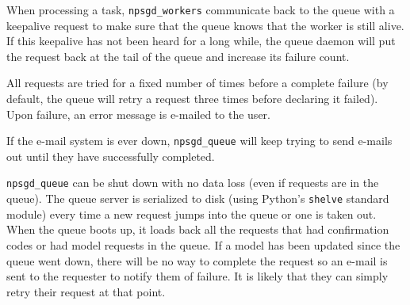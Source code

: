 \documentclass{article}
\begin{document}
When processing a task, \texttt{npsgd\_workers} communicate back to the queue
with a keepalive request to make sure that the queue knows that the worker is
still alive. If this keepalive has not been heard for a long while, the queue
daemon will put the request back at the tail of the queue and increase its failure count.

All requests are tried for a fixed number of times before a complete failure (by
default, the queue will retry a request three times before declaring it failed).
Upon failure, an error message is e-mailed to the user.

If the e-mail system is ever down, \texttt{npsgd\_queue} will keep trying to send e-mails out
until they have successfully completed.

\texttt{npsgd\_queue} can be shut down with no data loss (even if requests are
in the queue).
The queue server is serialized to disk (using Python's \texttt{shelve} standard
module) every time a new request jumps into the
queue or one is taken out. When the queue boots up, it loads back all the
requests that had confirmation codes or had model requests in the queue. If
a model has been updated since the queue went down, there will be no way to
complete the request so an e-mail is sent to the requester to notify them of
failure. It is likely that they can simply retry their request at that point.
\end{document}
